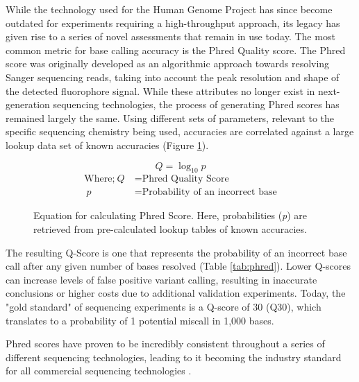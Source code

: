 While the technology used for the Human Genome Project has since become outdated for experiments requiring a high-throughput approach, its legacy has given rise to a series of novel assessments that remain in use today. The most common metric for base calling accuracy is the Phred Quality score. The Phred score was originally developed as an algorithmic approach towards resolving Sanger sequencing reads, taking into account the peak resolution and shape of the detected fluorophore signal. While these attributes no longer exist in next-generation sequencing technologies, the process of generating Phred scores has remained largely the same. Using different sets of parameters, relevant to the specific sequencing chemistry being used, accuracies are correlated against a large lookup data set of known accuracies (Figure \ref{eq:phred}). \\

\begin{figure}[!htbp]
\LARGE
\[Q=\log_{10}p\]
\normalsize
\begin{align*}
\text{Where;} ~Q\ &= \text{Phred Quality Score} \\
~p\ &= \text{Probability of an incorrect base}
\end{align*}
\caption[Equation for calculating Phred Score]{Equation for calculating Phred Score. Here, probabilities (\textit{p}) are retrieved from pre-calculated lookup tables of known accuracies.}
\label{eq:phred}
\end{figure}

The resulting Q-Score is one that represents the probability of an incorrect base call after any given number of bases resolved (Table \ref{tab:phred}). Lower Q-scores can increase levels of false positive variant calling, resulting in inaccurate conclusions or higher costs due to additional validation experiments. Today, the "gold standard" of sequencing experiments is a Q-score of 30 (Q30), which translates to a probability of 1 potential miscall in 1,000 bases.  

Phred scores have proven to be incredibly consistent throughout a series of different sequencing technologies, leading to it becoming the industry standard for all commercial sequencing technologies \cite{Richterich1998}. \\




